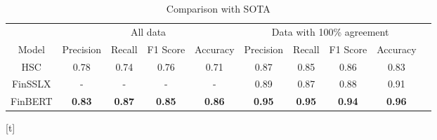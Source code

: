\documentclass[../main.tex]{subfiles}
\begin{document}
\begin{table}
  \caption{Comparison with SOTA}
  \label{tab:results}
  \begin{tabular}{cccccccccc}
    \toprule
      &  \multicolumn{4}{c}{All data} & \multicolumn{4}{c}{Data with 100\% agreement}\\
      \cmidrule(lr){2-5}
      \cmidrule(lr){6-9}
      Model & Precision & Recall & F1 Score & Accuracy & Precision & Recall & F1 Score & Accuracy \\
    \midrule
    HSC &               0.78 & 0.74 & 0.76 & 0.71 & 0.87 & 0.85 & 0.86 & 0.83\\
    FinSSLX &           - & - & - & - & 0.89 & 0.87 & 0.88 & 0.91\\
    FinBERT &               \textbf{0.83} & \textbf{0.87} & \textbf{0.85} & \textbf{0.86} & \textbf{0.95} & \textbf{0.95}  & \textbf{0.94} & \textbf{0.96}\\
  \bottomrule
\end{tabular}
\end{table}[t]
\end{document}
